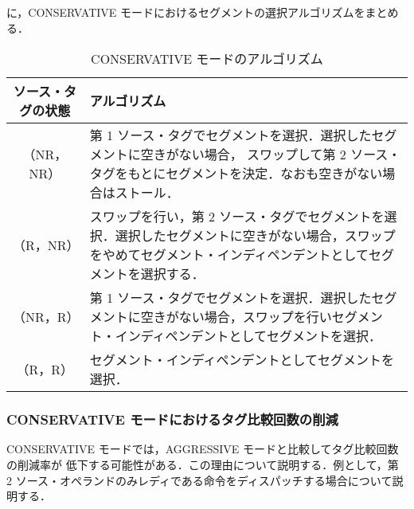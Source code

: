 に，CONSERVATIVE モードにおけるセグメントの選択アルゴリズムをまとめる．

\begin{table}[htb]
  \caption{CONSERVATIVE モードのアルゴリズム}
  \footnotesize
  \center
   \begin{tabular}{|c|p{13.5cm}|} \hline \hline
    ソース・タグの状態 & アルゴリズム \\ \hline
    （NR，NR） & 第 1 ソース・タグでセグメントを選択．選択したセグメントに空きがない場合， スワップして第 2 ソース・タグをもとにセグメントを決定．なおも空きがない場合はストール． \\ \hline
    （R，NR） & スワップを行い，第 2 ソース・タグでセグメントを選択．選択したセグメントに空きがない場合，スワップをやめてセグメント・インディペンデントとしてセグメントを選択する．\\ \hline
    （NR，R） & 第 1 ソース・タグでセグメントを選択．選択したセグメントに空きがない場合，スワップを行いセグメント・インディペンデントとしてセグメントを選択．\\ \hline
    （R，R） & セグメント・インディペンデントとしてセグメントを選択． \\ \hline
  \end{tabular}
  \label{tab:cons_algorithm}
\end{table}


\subsubsection{CONSERVATIVE モードにおけるタグ比較回数の削減}
CONSERVATIVE モードでは，AGGRESSIVE モードと比較してタグ比較回数の削減率が 低下する可能性がある．この理由について説明する．例として，第 2 ソース・オペランドのみレディである命令をディスパッチする場合について説明する．

